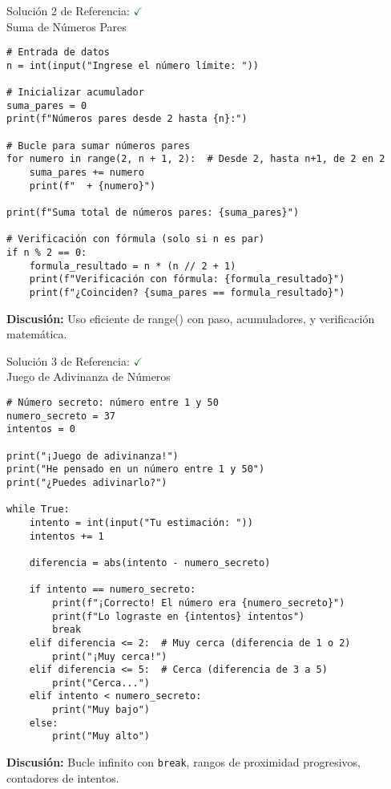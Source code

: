 \documentclass[10pt]{beamer}
\begin{document}
\begin{frame}[fragile]{Solución 2 de Referencia: \hfill \textcolor{green}{$\checkmark$} \\ Suma de Números Pares}
\begin{verbatim}
# Entrada de datos
n = int(input("Ingrese el número límite: "))

# Inicializar acumulador
suma_pares = 0
print(f"Números pares desde 2 hasta {n}:")

# Bucle para sumar números pares
for numero in range(2, n + 1, 2):  # Desde 2, hasta n+1, de 2 en 2
    suma_pares += numero
    print(f"  + {numero}")

print(f"Suma total de números pares: {suma_pares}")

# Verificación con fórmula (solo si n es par)
if n % 2 == 0:
    formula_resultado = n * (n // 2 + 1)
    print(f"Verificación con fórmula: {formula_resultado}")
    print(f"¿Coinciden? {suma_pares == formula_resultado}")
\end{verbatim}
\textbf{Discusión:} Uso eficiente de range() con paso, acumuladores, y verificación matemática.
\end{frame}


\begin{frame}[fragile]{Solución 3 de Referencia: \hfill \textcolor{green}{$\checkmark$} \\ Juego de Adivinanza de Números}
\begin{verbatim}
# Número secreto: número entre 1 y 50
numero_secreto = 37
intentos = 0

print("¡Juego de adivinanza!")
print("He pensado en un número entre 1 y 50")
print("¿Puedes adivinarlo?")

while True:
    intento = int(input("Tu estimación: "))
    intentos += 1
    
    diferencia = abs(intento - numero_secreto)
    
    if intento == numero_secreto:
        print(f"¡Correcto! El número era {numero_secreto}")
        print(f"Lo lograste en {intentos} intentos")
        break
    elif diferencia <= 2:  # Muy cerca (diferencia de 1 o 2)
        print("¡Muy cerca!")
    elif diferencia <= 5:  # Cerca (diferencia de 3 a 5)
        print("Cerca...")
    elif intento < numero_secreto:
        print("Muy bajo")
    else:
        print("Muy alto")
\end{verbatim}
\textbf{Discusión:} Bucle infinito con \texttt{break}, rangos de proximidad progresivos, contadores de intentos.
\end{frame}
\end{document}
